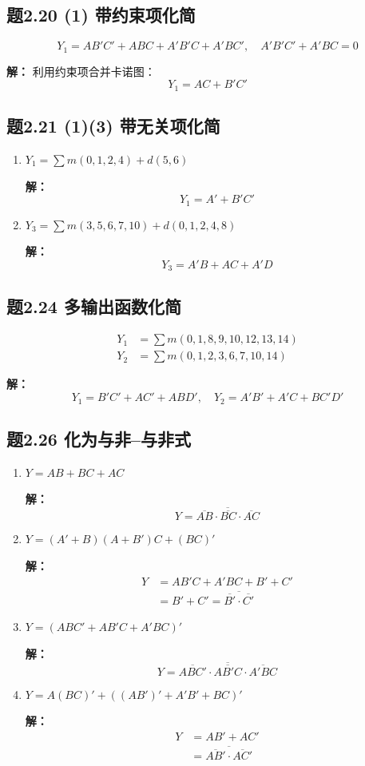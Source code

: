 \subsection{题2.20 (1) 带约束项化简}
\[
Y_1 = AB'C' + ABC + A'B'C + A'BC',\quad A'B'C' + A'BC = 0
\]

\textbf{解：}
利用约束项合并卡诺图：
\[
Y_1 = AC + B'C'
\]

\subsection{题2.21 (1)(3) 带无关项化简}
\begin{enumerate}
    \item $Y_1 = \sum m(0,1,2,4) + d(5,6)$

    \textbf{解：}
    \[
    Y_1 = A' + B'C'
    \]

    \item $Y_3 = \sum m(3,5,6,7,10) + d(0,1,2,4,8)$

    \textbf{解：}
    \[
    Y_3 = A'B + AC + A'D
    \]
\end{enumerate}

\subsection{题2.24 多输出函数化简}
\begin{align*}
Y_1 &= \sum m(0,1,8,9,10,12,13,14) \\
Y_2 &= \sum m(0,1,2,3,6,7,10,14)
\end{align*}

\textbf{解：}
\[
Y_1 = B'C' + AC' + ABD',\quad
Y_2 = A'B' + A'C + BC'D'
\]

\subsection{题2.26 化为与非–与非式}
\begin{enumerate}
    \item $Y = AB + BC + AC$

    \textbf{解：}
    \[
    Y = \overline{\overline{AB} \cdot \overline{BC} \cdot \overline{AC}}
    \]

    \item $Y = (A' + B)(A + B')C + (BC)'$

    \textbf{解：}
    \begin{align*}
    Y &= AB'C + A'BC + B' + C' \\
      &= B' + C' = \overline{\overline{B'} \cdot \overline{C'}}
    \end{align*}

    \item $Y = (ABC' + AB'C + A'BC)'$

    \textbf{解：}
    \[
    Y = \overline{\overline{ABC'} \cdot \overline{AB'C} \cdot \overline{A'BC}}
    \]

    \item $Y = A(BC)' + ((AB')' + A'B' + BC)'$

    \textbf{解：}
    \begin{align*}
    Y &= AB' + AC' \\
      &= \overline{\overline{AB'} \cdot \overline{AC'}}
    \end{align*}
\end{enumerate}